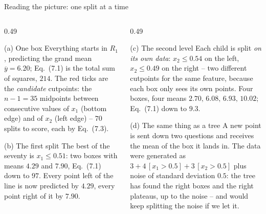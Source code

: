 \documentclass[10pt,aspectratio=169]{beamer}
\begin{document}
\begin{frame}{Reading the picture: one split at a time}
\small
\begin{columns}[T]
\begin{column}{0.49\textwidth}
\begin{block}{(a) One box}
Everything starts in $R_1$, predicting the grand mean $\overline{y}=6.20$;
Eq.~(7.1) is the total sum of squares, $214$.  The red ticks are the
\emph{candidate} cutpoints: the $n-1=35$ midpoints between consecutive
values of $x_1$ (bottom edge) and of $x_2$ (left edge) -- $70$ splits to
score, each by Eq.~(7.3).
\end{block}
\begin{block}{(b) The first split}
The best of the seventy is $x_1\le 0.51$: two boxes with means $4.29$ and
$7.90$, Eq.~(7.1) down to $97$.  Every point left of the line is now
predicted by $4.29$, every point right of it by $7.90$.
\end{block}
\end{column}
\begin{column}{0.49\textwidth}
\begin{block}{(c) The second level}
Each child is split \emph{on its own data}: $x_2\le 0.54$ on the left,
$x_2\le 0.49$ on the right -- two different cutpoints for the same feature,
because each box only sees its own points.  Four boxes, four means
$2.70,\,6.08,\,6.93,\,10.02$; Eq.~(7.1) down to $9.3$.
\end{block}
\begin{block}{(d) The same thing as a tree}
A new point is sent down two questions and receives the mean of the box it
lands in.  The data were generated as $3+4\,[x_1>0.5]+3\,[x_2>0.5]$ plus
noise of standard deviation $0.5$: the tree has found the right boxes and
the right plateaus, up to the noise -- and would keep splitting the noise
if we let it.
\end{block}
\end{column}
\end{columns}
\end{frame}
\end{document}
